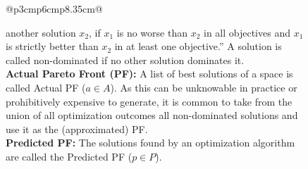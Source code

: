 \documentclass[sigconf]{acmart}
\newcommand\TODO[1]{\textcolor{ScarletRed}{\textbf{\colorbox{yellow}{\small TODO:}} \emph{#1}}\xspace}
\begin{document}
\begin{figure}
{\begin{tabular}{@{}p{3cm}p{6cm}p{8.35cm}@{}}
{\begin{minipage}[b]{0.63\linewidth}
                                another solution $x_2$, if $x_1$ is no worse than $x_2$ in all objectives
                                and $x_1$ is strictly better than $x_2$ in at least one objective.'' A solution is called non-dominated if no other solution dominates it.\\
                                \textbf{Actual {Pareto Front} (PF): } A list of best solutions of a space is called Actual PF ($a\in A$). As this can be unknowable in practice or prohibitively expensive to generate, it is common to take from the union of all optimization outcomes all non-dominated solutions and use it as the (approximated) PF.\\ 
                                \textbf{Predicted PF: } The solutions found by {an optimization} algorithm are called the Predicted PF ($p\in P$).
                        \end{minipage}
                } \\ 
                 \\
\end{tabular}}
\end{figure}
\end{document}
